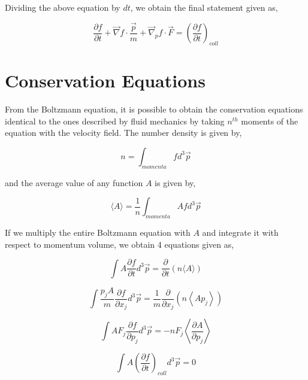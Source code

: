 \no Dividing the above equation by $dt$, we obtain the final statement given as,

\begin{equation}
	\frac{\partial f}{\partial t}+ \vec{\nabla}f \cdot \frac{\vec{p}}{m} + \vec{\nabla}_p f \cdot \vec{F} = \left( \frac{\partial f}{\partial t} \right)_{coll}
\end{equation}

\section{Conservation Equations}

From the Boltzmann equation, it is possible to obtain the conservation equations identical to the ones described by fluid mechanics by taking $n^{th}$ moments of the equation with the velocity field. The number density is given by,

\begin{equation}
	n = \int_{momenta}	f d^3\vec{p}
\end{equation}

\no and the average value of any function $ A $ is given by,

\begin{equation}
	\langle A \rangle = \frac{1}{n} \int_{momenta} A f d^3\vec{p}
\end{equation}

\no If we multiply the entire Boltzmann equation with $A$ and integrate it with respect to momentum volume, we obtain 4 equations given as,

\begin{equation}
	\int A \frac{\partial f}{\partial t} d^3\vec{p} = \frac{\partial}{\partial t} \left( n \langle A \rangle \right)
\end{equation}

\begin{equation}
	\int \frac{p_jA}{m} \frac{\partial f}{\partial x_j} d^3\vec{p} = \frac{1}{m} \frac{\partial}{\partial x_j} \left( n \left\langle Ap_j \right\rangle \right)
\end{equation}

\begin{equation}
	\int A F_j \frac{\partial f}{\partial p_j} d^3\vec{p} = - n F_j \left\langle \frac{\partial A}{\partial p_j} \right\rangle
\end{equation}

\begin{equation}
	\int A \left( \frac{\partial f}{\partial t} \right)_{coll} d^3 \vec{p} = 0
\end{equation}

